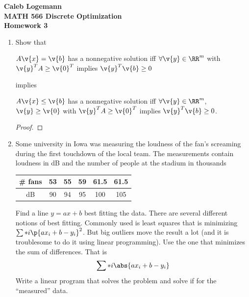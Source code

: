 \documentclass[11pt, oneside]{article}
\begin{document}
\noindent \textbf{\Large{Caleb Logemann \\
MATH 566 Discrete Optimization\\
Homework 3
}}

%
\begin{enumerate}
    \item %
        Show that
        \begin{center}
            $A\v{x} = \v{b}$ has a nonnegative solution iff
            $\forall \v{y} \in \RR^m$ with $\v{y}^T A \ge \v{0}^T$ implies
            $\v{y}^T \v{b} \ge 0$
        \end{center}
        implies
        \begin{center}
            $A\v{x} \le \v{b}$ has a nonnegative solution iff
            $\forall \v{y} \in \RR^m$, $\v{y} \ge \v{0}$ with $\v{y}^T A \ge \v{0}^T$
            implies $\v{y}^T \v{b} \ge 0$.
        \end{center}

        \begin{proof}
        
        \end{proof}

    \item %
        Some university in Iowa was measuring the loudness of the fan's
        screaming during the first touchdown of the local team.
        The measurements contain loudness in dB and the number of people at the
        stadium in thousands
        \begin{center}
            \begin{tabular}{*{6}c}
                \toprule
                \# fans & 53 & 55 & 59 & 61.5 & 61.5 \\
                \midrule
                dB     & 90 & 94 & 95 &  100 &  105 \\
                \bottomrule
            \end{tabular}
        \end{center}
        Find a line $y = ax + b$ best fitting the data.
        There are several different notions of best fitting.
        Commonly used is least squares that is minimizing $\sum*{i}{}{\p{ax_i + b - y_i}^2}$.
        But big outliers move the result a lot (and it is troublesome to do it
        using linear programming).
        Use the one that minimizes the sum of differences. That is
        \[
            \sum*{i}{}{\abs{a x_i + b - y_i}}
        \]
        Write a linear program that solves the problem and solve if for the
        ``measured'' data.


\end{enumerate}
\end{document}
